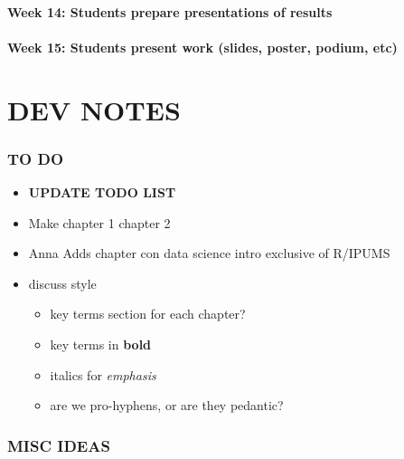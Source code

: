 \documentclass[
]{book}
\providecommand{\tightlist}{%
  \setlength{\itemsep}{0pt}\setlength{\parskip}{0pt}}
\begin{document}
\hypertarget{week-14-students-prepare-presentations-of-results}{%
\subsubsection*{Week 14: Students prepare presentations of results}\label{week-14-students-prepare-presentations-of-results}}

\hypertarget{week-15-students-present-work-slides-poster-podium-etc}{%
\subsubsection*{Week 15: Students present work (slides, poster, podium, etc)}\label{week-15-students-present-work-slides-poster-podium-etc}}

\hypertarget{dev-notes}{%
\chapter*{DEV NOTES}\label{dev-notes}}

\hypertarget{to-do}{%
\subsection*{TO DO}\label{to-do}}

\begin{itemize}
\item
  \textbf{UPDATE TODO LIST}
\item
  Make chapter 1 chapter 2
\item
  Anna Adds chapter con data science intro exclusive of R/IPUMS
\item
  discuss style

  \begin{itemize}
  \tightlist
  \item
    key terms section for each chapter?
  \item
    key terms in \textbf{bold}
  \item
    italics for \emph{emphasis}
  \item
    are we pro-hyphens, or are they pedantic?
  \end{itemize}
\end{itemize}

\hypertarget{misc-ideas}{%
\subsection*{MISC IDEAS}\label{misc-ideas}}
\end{document}
